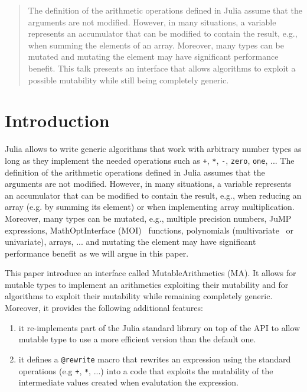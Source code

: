 \documentclass{juliacon}
\begin{document}


\maketitle

\begin{abstract}

The definition of the arithmetic operations defined in Julia assume that the arguments are not modified.
However, in many situations, a variable represents an accumulator that can be modified to contain the result, e.g., when summing the elements of an array.
Moreover, many types can be mutated and mutating the element may have significant performance benefit.
This talk presents an interface that allows algorithms to exploit a possible mutability while still being completely generic.

\end{abstract}

\section{Introduction}

Julia allows to write generic algorithms that work with arbitrary number types as long as they implement the needed operations
such as \texttt{+}, \texttt{*}, \texttt{-}, \texttt{zero}, \texttt{one}, ...
The definition of the arithmetic operations defined in Julia assumes that the arguments are not modified.
However, in many situations, a variable represents an accumulator that can be modified to contain the result, e.g.,
when reducing an array (e.g. by summing its element) or when implementing array multiplication.
Moreover, many types can be mutated, e.g., multiple precision numbers, JuMP~\cite{dunning2017jump} expressions, MathOptInterface (MOI)~\cite{legat2021mathoptinterface} functions, polynomials (multivariate~\cite{legat2021multivariatepolynomials} or univariate), arrays, ... and mutating the element may have significant performance benefit as we will argue in this paper.

This paper introduce an interface called MutableArithmetics (MA).
It allows for mutable types to implement an arithmetics exploiting their mutability and for algorithms to
exploit their mutability while remaining completely generic.
Moreover, it provides the following additional features:
\begin{enumerate}
  \item
    \label{item:reimplement}
    it re-implements part of the Julia standard library on top of the API to allow mutable type to use a more efficient version than the default one.
  \item
    \label{item:rewrite}
    it defines a \texttt{@rewrite} macro that rewrites an expression using the standard operations (e.g \texttt{+}, \texttt{*}, ...) into a code that exploits the mutability of the intermediate values created when evalutation the expression.
\end{enumerate}
\end{document}
